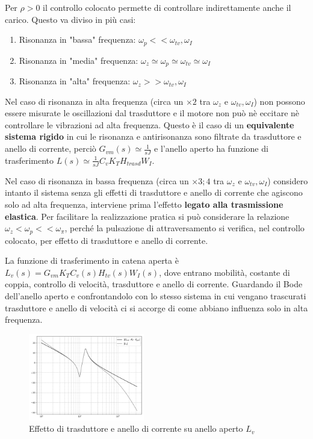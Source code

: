 Per \(\rho > 0\) il controllo colocato permette di controllare indirettamente anche il carico.
Questo va diviso in più casi:
\begin{enumerate}
    \item Risonanza in "bassa" frequenza: \(\omega_p << \omega_{tv}, \omega_I\)
    \item Risonanza in "media" frequenza: \(\omega_z \simeq \omega_p \simeq \omega_{tv} \simeq \omega_I\)
    \item Risonanza in "alta" frequenza: \(\omega_z >> \omega_{tv}, \omega_I\)
\end{enumerate} 

Nel caso di risonanza in alta frequenza (circa un \(\times 2\) tra \(\omega_z\) e \(\omega_{tv},\omega_I\)) non possono essere misurate le oscillazioni dal trasduttore e il motore non può nè eccitare nè controllare le vibrazioni ad alta frequenza. Questo è il caso di un \textbf{equivalente sistema rigido} in cui le risonanza e antirisonanza sono filtrate da trasduttore e anello di corrente, perciò \(G_{vm}(s) \simeq \frac{1}{sJ}\) e l'anello aperto ha funzione di trasferimento \(L(s) \simeq \frac{1}{sJ} C_v K_T H_{trasd} W_I\).

Nel caso di risonanza in bassa frequenza (circa un \(\times 3;4\) tra \(\omega_z\) e \(\omega_{tv}, \omega_I\)) considero intanto il sistema senza gli effetti di trasduttore e anello di corrente che agiscono solo ad alta frequenza, interviene prima l'effetto \textbf{legato alla trasmissione elastica}.
Per facilitare la realizzazione pratica si può considerare la relazione \(\omega_z < \omega_p << \omega_\pi\), perché la pulsazione di attraversamento si verifica, nel controllo colocato, per effetto di trasduttore e anello di corrente.

La funzione di trasferimento in catena aperta è \(L_v(s) = G_{vm}K_T C_v(s) H_{tv}(s) W_I(s)\), dove entrano mobilità, costante di coppia, controllo di velocità, trasduttore e anello di corrente.
Guardando il Bode dell'anello aperto e confrontandolo con lo stesso sistema in cui vengano trascurati trasduttore e anello di velocità ci si accorge di come abbiano influenza solo in alta frequenza.

\begin{figure}[h]
    \centering
    \includegraphics[width=0.45\textwidth]{Immagini/risonanza_bassa_f_Gvm_vs_Lv.png}
    \caption{Effetto di trasduttore e anello di corrente su anello aperto \(L_v\)}
\end{figure}

